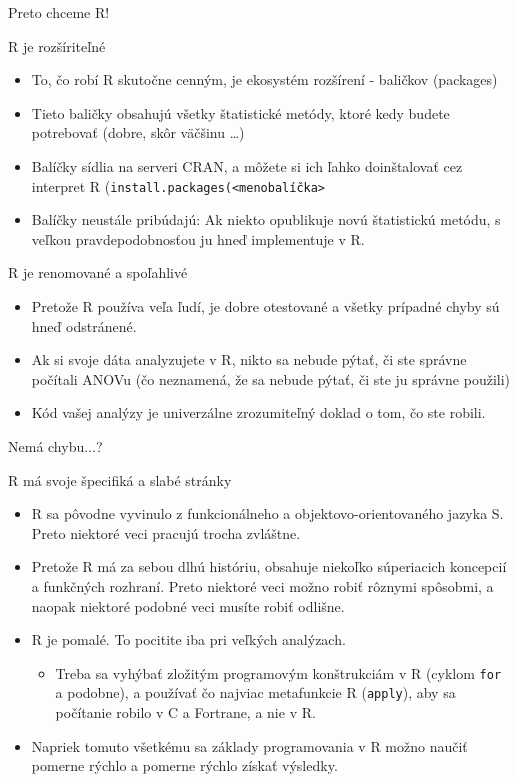 \begin{frame}{Preto chceme R!}
	\begin{block}{R je rozšíriteľné}
		\begin{itemize}
			\item To, čo robí R skutočne cenným, je ekosystém rozšírení - baličkov (packages)
			\item Tieto baličky obsahujú všetky štatistické metódy, ktoré kedy budete potrebovať (dobre, skôr väčšinu \dots)
			\item Balíčky sídlia na serveri CRAN, a môžete si ich ľahko doinštalovať cez interpret R (\texttt{install.packages(<menobalíčka>}
			\item Balíčky neustále pribúdajú: Ak niekto opublikuje novú štatistickú metódu, s veľkou pravdepodobnosťou ju hneď implementuje v R.
		\end{itemize}
	\end{block}
	\begin{block}{R je renomované a spoľahlivé}
		\begin{itemize}
			\item Pretože R používa veľa ľudí, je dobre otestované a všetky prípadné chyby sú hneď odstránené.
			\item Ak si svoje dáta analyzujete v R, nikto sa nebude pýtať, či ste správne počítali ANOVu (čo neznamená, že sa nebude pýtať, či ste ju správne použili)
			\item Kód vašej analýzy je univerzálne zrozumiteľný doklad o tom, čo ste robili.
		\end{itemize}
	\end{block}
\end{frame}

\begin{frame}{Nemá chybu...?}
	\begin{block}{R má svoje špecifiká a slabé stránky}
		\begin{itemize}
			\item R sa pôvodne vyvinulo z funkcionálneho a objektovo-orientovaného jazyka S. Preto niektoré veci pracujú trocha zvláštne.
			\item Pretože R má za sebou dlhú históriu, obsahuje niekoľko súperiacich koncepcií a funkčných rozhraní. Preto niektoré veci možno robiť rôznymi spôsobmi, a naopak niektoré podobné veci musíte robiť odlišne.
			\item R je pomalé. To pocitite iba pri veľkých analýzach.
			\begin{itemize}
				\item Treba sa vyhýbať zložitým programovým konštrukciám v R (cyklom \texttt{for} a podobne), a používať čo najviac metafunkcie R (\texttt{apply}), aby sa počítanie robilo v C a Fortrane, a nie v R. 
			\end{itemize}
			\item Napriek tomuto všetkému sa základy programovania v R možno naučiť pomerne rýchlo a pomerne rýchlo získať výsledky.
		\end{itemize}
	\end{block}
\end{frame}
